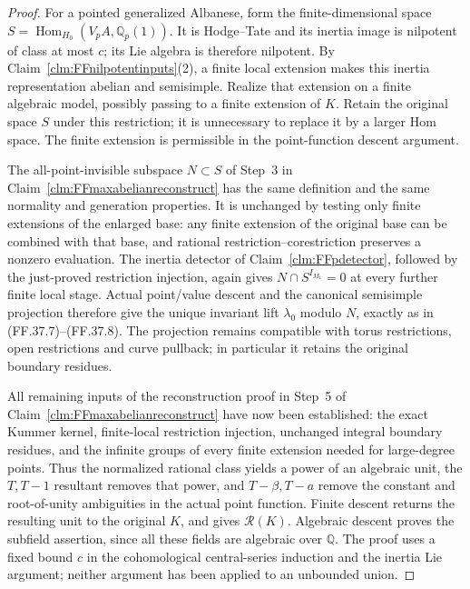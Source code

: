 \begin{proof}
For a pointed generalized Albanese,
form the finite-dimensional space
\(S=\operatorname{Hom}_{H_0}(V_pA,\mathbb Q_p(1))\).
It is Hodge--Tate and its inertia
image is nilpotent of class at
most \(c\); its Lie algebra
is therefore nilpotent.
By Claim~\ref{clm:FFnilpotentinputs}(2),
a finite local extension makes
this inertia representation abelian
and semisimple. Realize that
extension on a finite algebraic
model, possibly passing to a
finite extension of \(K\).
Retain the original space \(S\)
under this restriction; it is
unnecessary to replace it by
a larger Hom space. The finite
extension is permissible in the
point-function descent argument.

The all-point-invisible subspace
\(N\subset S\) of Step~3 in
Claim~\ref{clm:FFmaxabelianreconstruct}
has the same definition and the
same normality and generation
properties. It is unchanged by
testing only finite extensions
of the enlarged base: any finite
extension of the original base
can be combined with that base,
and rational restriction--corestriction
preserves a nonzero evaluation.
The inertia detector of
Claim~\ref{clm:FFpdetector}, followed
by the just-proved restriction
injection, again gives
\(N\cap S^{I_{M_1}}=0\) at
every further finite local stage.
Actual point/value descent and
the canonical semisimple projection
therefore give the unique invariant
lift \(\lambda_0\) modulo \(N\),
exactly as in (FF.37.7)--(FF.37.8).
The projection remains compatible
with torus restrictions, open
restrictions and curve pullback;
in particular it retains the
original boundary residues.

All remaining inputs of the
reconstruction proof in Step~5
of Claim~\ref{clm:FFmaxabelianreconstruct}
have now been established: the
exact Kummer kernel, finite-local
restriction injection, unchanged
integral boundary residues, and
the infinite groups of every
finite extension needed for
large-degree points. Thus the
normalized rational class yields
a power of an algebraic unit,
the \(T,T-1\) resultant removes
that power, and \(T-\beta,T-a\)
remove the constant and root-of-unity
ambiguities in the actual point
function. Finite descent returns
the resulting unit to the
original \(K\), and
\citep[Theorem~4.18(5)]{FF_CHW2024}
gives \(\mathcal R(K)\).
Algebraic descent proves the
subfield assertion, since all
these fields are algebraic
over \(\mathbb Q\).
The proof uses a fixed bound
\(c\) in the cohomological
central-series induction and
the inertia Lie argument;
neither argument has been
applied to an unbounded union.
\end{proof}
